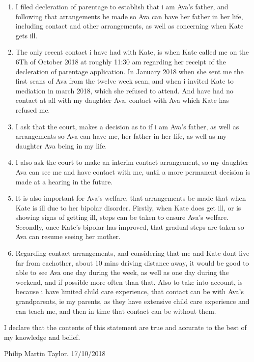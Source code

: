 \documentclass[10pt,a4paper]{book}
\begin{document}
\begin{enumerate}
  \item I filed decleration of parentage to establish that i am Ava's father, and following that arrangements be made so Ava can have her father in her life, including contact and other arrangements, as well as concerning when Kate gets ill.
  \item The only recent contact i have had with Kate, is when Kate called me on the 6Th of October 2018 at roughly 11:30 am regarding her receipt of the decleration of parentage application. In January 2018 when she sent me the first scans of Ava from the twelve week scan, and when i invited Kate to mediation in march 2018, which she refused to attend. And have had no contact at all with my daughter Ava, contact with Ava which Kate has refused me.
  \item I ask that the court, makes a decision as to if i am Ava's father, as well as arrangements so Ava can have me, her father in her life, as well as my daughter Ava being in my life.
  \item I also ask the court to make an interim contact arrangement, so my daughter Ava can see me and have contact with me, until a more permanent decision is made at a hearing in the future.
  \item It is also important for Ava's welfare, that arrangements be made that when Kate is ill due to her bipolar disorder. Firstly, when Kate does get ill, or is showing signs of getting ill, steps can be taken to ensure Ava's welfare. Secondly, once Kate's bipolar has improved, that gradual steps are taken so Ava can resume seeing her mother.
    \item Regarding contact arrangements, and considering that me and Kate dont live far from eachother, about 10 mins driving distance away, it would be good to able to see Ava one day during the week, as well as one day during the weekend, and if possible more often than that. Also to take into account, is because i have limited child care experience, that contact can be with Ava's grandparents, ie my parents, as they have extensive child care experience and can teach me, and then in time that contact can be without them. 
    \end{enumerate}
    \begin{flushleft}
      I declare that the contents of this statement are true and accurate to the best of my knowledge and belief.
\end{flushleft}
\begin{center}
  Philip Martin Taylor. 17/10/2018
\end{center}
\end{document}
